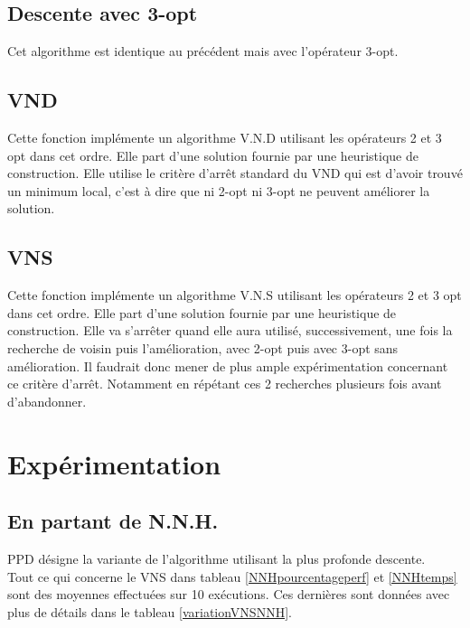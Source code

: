 \documentclass[12pt,a4paper]{article}
\begin{document}
\subsection{Descente avec 3-opt}

Cet algorithme est identique au précédent mais avec l'opérateur 3-opt.

\subsection{VND}

Cette fonction implémente un algorithme V.N.D utilisant les opérateurs 2 et 3 opt dans cet ordre. Elle part d'une solution fournie par une heuristique de construction. Elle utilise le critère d’arrêt standard du VND qui est d'avoir trouvé un minimum local, c'est à dire que ni 2-opt ni 3-opt ne peuvent améliorer la solution.

\subsection{VNS}

Cette fonction implémente un algorithme V.N.S utilisant les opérateurs 2 et 3 opt dans cet ordre. Elle part d'une solution fournie par une heuristique de construction. Elle va s’arrêter quand elle aura utilisé, successivement, une fois la recherche de voisin puis l'amélioration, avec 2-opt puis avec 3-opt sans amélioration. Il faudrait donc mener de plus ample expérimentation concernant ce critère d’arrêt. Notamment en répétant ces 2 recherches plusieurs fois avant d'abandonner.

\section{Expérimentation}
\subsection{En partant de N.N.H.}
PPD désigne la variante de l'algorithme utilisant la plus profonde descente.\\
Tout ce qui concerne le VNS dans tableau \ref{NNHpourcentageperf} et \ref{NNHtemps} sont des moyennes effectuées sur 10 exécutions. Ces dernières sont données avec plus de détails dans le tableau \ref{variationVNSNNH}.\\
\end{document}
